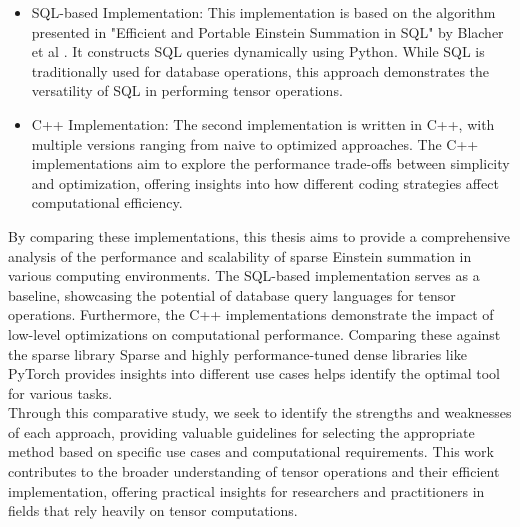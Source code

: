 \begin{itemize}
      \item SQL-based Implementation:
            This implementation is based on the algorithm presented in "Efficient and
            Portable Einstein Summation in SQL" by Blacher et al \cite{sql_einsum}.
            It constructs SQL queries dynamically using Python. While SQL is
            traditionally used for database operations, this approach demonstrates
            the versatility of SQL in performing tensor operations.
      \item C++ Implementation: The second implementation is written in C++, with multiple
            versions ranging from naive to optimized approaches. The C++ implementations
            aim to explore the performance trade-offs between simplicity and optimization,
            offering insights into how different coding strategies affect computational efficiency.
\end{itemize}
%
By comparing these implementations, this thesis aims to provide a comprehensive
analysis of the performance and scalability of sparse Einstein summation in various
computing environments. The SQL-based implementation serves as a baseline,
showcasing the potential of database query languages for tensor operations.
Furthermore, the C++ implementations demonstrate the impact of low-level optimizations
on computational performance. Comparing these against the sparse library Sparse and
highly performance-tuned dense libraries like PyTorch provides insights into different
use cases helps identify the optimal tool for various tasks.
\\
Through this comparative study, we seek to identify the strengths and weaknesses
of each approach, providing valuable guidelines for selecting the appropriate
method based on specific use cases and computational requirements. This work
contributes to the broader understanding of tensor operations and their efficient
implementation, offering practical insights for researchers and practitioners
in fields that rely heavily on tensor computations.